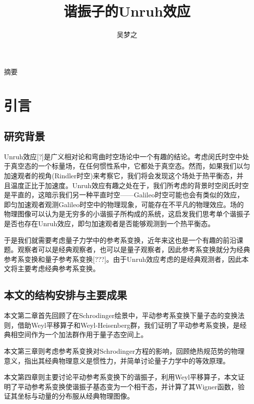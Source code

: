 \documentclass[a4paper]{article}
\title{谐振子的Unruh效应}
\author{吴梦之}
\begin{document}
    \maketitle

    \begin{center}
        \fontsize{18pt}{0}摘\quad\quad 要
    \end{center}



    \section{引言}

    \subsection{研究背景}

        Unruh效应[?]是广义相对论和弯曲时空场论中一个有趣的结论。考虑闵氏时空中处于真空态的一个标量场，在任何惯性系中，它都处于真空态。然而，如果我们以匀加速观者的视角(Rindler时空)来考察它，我们将会发现这个场处于热平衡态，并且温度正比于加速度。Unruh效应有趣之处在于，我们所考虑的背景时空闵氏时空是平直的，这暗示我们另一种平直时空——Galileo时空可能也会有类似的效应，即匀加速观者观测Galileo时空中的物理现象，可能存在不平凡的物理效应。场的物理图像可以认为是无穷多的小谐振子所构成的系统，这启发我们思考单个谐振子是否也存在Unruh效应，即匀加速观者是否能够观测到一个热平衡态。

        于是我们就需要考虑量子力学中的参考系变换，近年来这也是一个有趣的前沿课题。观察者可以是经典观察者，也可以是量子观察者，因此参考系变换就分为经典参考系变换和量子参考系变换[???]。由于Unruh效应考虑的是经典观测者，因此本文将主要考虑经典参考系变换。

    \subsection{本文的结构安排与主要成果}

        本文第二章首先回顾了在Schrodinger绘景中，平动参考系变换下量子态的变换法则，借助Weyl平移算子和Weyl-Heisenberg群，我们证明了平动参考系变换，是经典相空间作为一个加法群作用于量子态空间上。

        本文第三章则考虑参考系变换对Schrodinger方程的影响，回顾绝热规范势的物理意义，指出其经典物理意义是惯性力，并简单讨论量子力学中的等效原理。

        本文第四章则主要讨论平动参考系变换下的谐振子，利用Weyl平移算子，本文证明了平动参考系变换使谐振子基态变为一个相干态，并计算了其Wigner函数，验证其坐标与动量的分布服从经典物理图像。
\end{document}
